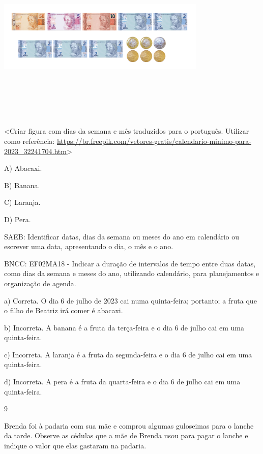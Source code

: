 \begin{escolha}
\begin{escolha}
{{{{{{{{\includegraphics[width=3.93750in,height=3.28945in]{media/image156.png}

\textless{}Criar figura com dias da semana e mês traduzidos para o
português. Utilizar como referência:
\url{https://br.freepik.com/vetores-gratis/calendario-minimo-para-2023_32241704.htm}\textgreater{}

A) Abacaxi.

B) Banana.

C) Laranja.

D) Pera.

SAEB: Identificar datas, dias da semana ou meses do ano em
calendário ou escrever uma data, apresentando o dia, o mês e o ano.

BNCC: EF02MA18 - Indicar a duração de intervalos de tempo entre duas
datas, como dias da semana e meses do ano, utilizando calendário, para
planejamentos e organização de agenda.

a) Correta. O dia 6 de julho de 2023 cai numa quinta-feira; portanto; a
fruta que o filho de Beatriz irá comer é abacaxi.

b) Incorreta. A banana é a fruta da terça-feira e o dia 6 de julho cai
em uma quinta-feira.

c) Incorreta. A laranja é a fruta da segunda-feira e o dia 6 de julho
cai em uma quinta-feira.

d) Incorreta. A pera é a fruta da quarta-feira e o dia 6 de julho cai em uma quinta-feira.

\num{9}

Brenda foi à padaria com sua mãe e comprou algumas guloseimas para o
lanche da tarde. Observe as cédulas que a mãe de Brenda usou para pagar
o lanche e indique o valor que elas gastaram na padaria.

}}}}}}}}
\end{escolha}
\end{escolha}
